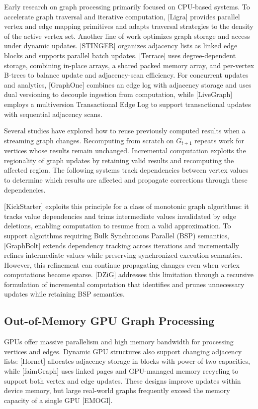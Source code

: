 Early research on graph processing primarily focused on CPU-based systems. To accelerate graph traversal and iterative computation, [Ligra] provides parallel vertex and edge mapping primitives and adapts traversal strategies to the density of the active vertex set. Another line of work optimizes graph storage and access under dynamic updates. [STINGER] organizes adjacency lists as linked edge blocks and supports parallel batch updates. [Terrace] uses degree-dependent storage, combining in-place arrays, a shared packed memory array, and per-vertex B-trees to balance update and adjacency-scan efficiency. For concurrent updates and analytics, [GraphOne] combines an edge log with adjacency storage and uses dual versioning to decouple ingestion from computation, while [LiveGraph] employs a multiversion Transactional Edge Log to support transactional updates with sequential adjacency scans.

Several studies have explored how to reuse previously computed results when a streaming graph changes. Recomputing from scratch on $G_{t+1}$ repeats work for vertices whose results remain unchanged. Incremental computation exploits the regionality of graph updates by retaining valid results and recomputing the affected region. The following systems track dependencies between vertex values to determine which results are affected and propagate corrections through these dependencies.

[KickStarter] exploits this principle for a class of monotonic graph algorithms: it tracks value dependencies and trims intermediate values invalidated by edge deletions, enabling computation to resume from a valid approximation. To support algorithms requiring Bulk Synchronous Parallel (BSP) semantics, [GraphBolt] extends dependency tracking across iterations and incrementally refines intermediate values while preserving synchronized execution semantics. However, this refinement can continue propagating changes even when vertex computations become sparse. [DZiG] addresses this limitation through a recursive formulation of incremental computation that identifies and prunes unnecessary updates while retaining BSP semantics.

\subsection{Out-of-Memory GPU Graph Processing}


GPUs offer massive parallelism and high memory bandwidth for processing vertices and edges. Dynamic GPU structures also support changing adjacency lists: [Hornet] allocates adjacency storage in blocks with power-of-two capacities, while [faimGraph] uses linked pages and GPU-managed memory recycling to support both vertex and edge updates. These designs improve updates within device memory, but large real-world graphs frequently exceed the memory capacity of a single GPU [EMOGI].

